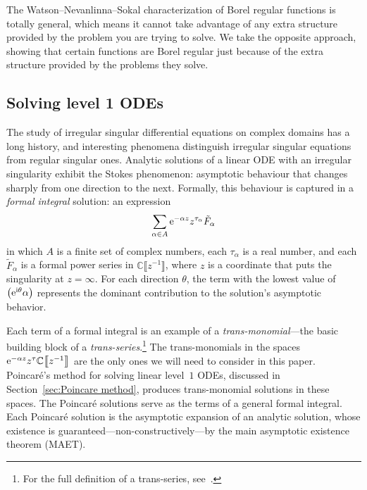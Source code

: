 \documentclass[10pt,a4paper]{amsart}
\let\Re\relax
\DeclareMathOperator{\Re}{Re}
\newcommand{\C}{\mathbb{C}}
\newcommand{\series}[1]{\tilde{#1}}
\numberwithin{equation}{section}
\begin{document}
The Watson--Nevanlinna--Sokal characterization of Borel regular functions is totally general, which means it cannot take advantage of any extra structure provided by the problem you are trying to solve. We take the opposite approach, showing that certain functions are Borel regular just because of the extra structure provided by the problems they solve.
%
\subsection[Solving level 1 ODEs]{Solving level 1 ODEs}\label{sec:history_ODE}
%
The study of irregular singular differential equations on complex domains has a long history, and interesting phenomena distinguish irregular singular equations from regular singular ones. Analytic solutions of a linear ODE with an irregular singularity exhibit the Stokes phenomenon: asymptotic behaviour that changes sharply from one direction to the next. Formally, this behaviour is captured in a {\em formal integral} solution: an expression
\[ \sum_{\alpha \in A} {\rm e}^{-\alpha z} z^{\tau_\alpha} \series{F}_\alpha \]
in which $A$ is a finite set of complex numbers, each $\tau_\alpha$ is a real number, and each $\series{F}_\alpha$ is a formal power series in $\C\big\llbracket z^{-1} \big\rrbracket$, where $z$ is a coordinate that puts the singularity at $z = \infty$. For each direction $\theta$, the term with the lowest value of $\Re\bigl({\rm e}^{{\rm i}\theta} \alpha\bigr)$ represents the dominant contribution to the solution's asymptotic behavior.

Each term of a formal integral is an example of a {\em trans-monomial}---the basic building block of a {\em trans-series}.\footnote{For the full definition of a trans-series, see~\cite{costin_transseries,costin_summability,van-der-hoeven2001complex,EcalleIII}.} The trans-monomials in the spaces ${\rm e}^{-\alpha z} z^\tau \C\big\llbracket z^{-1} \big\rrbracket$ are the only ones we will need to consider in this paper. Poincar\'e's method for solving linear level~$1$ ODEs, discussed in Section~\ref{sec:Poincare method}, produces trans-monomial solutions in these spaces. The Poincar\'e solutions serve as the terms of a general formal integral. Each Poincar\'e solution is the asymptotic expansion of an analytic solution, whose existence is guaranteed---non-constructively---by the main asymptotic existence theorem (MAET).
\end{document}
